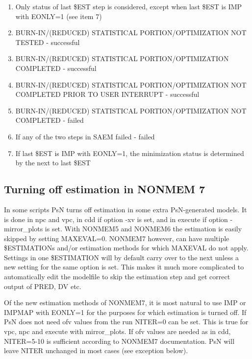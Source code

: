 \begin{enumerate}
\item Only status of last \$EST step is considered, except when last \$EST is IMP with EONLY=1 (see item 7)
\item BURN-IN/(REDUCED) STATISTICAL PORTION/OPTIMIZATION NOT TESTED - successful
\item BURN-IN/(REDUCED) STATISTICAL PORTION/OPTIMIZATION COMPLETED - successful
\item BURN-IN/(REDUCED) STATISTICAL PORTION/OPTIMIZATION NOT COMPLETED PRIOR TO USER INTERRUPT - successful
\item BURN-IN/(REDUCED) STATISTICAL PORTION/OPTIMIZATION NOT COMPLETED - failed
\item If any of the two steps in SAEM failed - failed 
\item If last \$EST is IMP with EONLY=1, the minimization status is determined by the next to last \$EST
\end{enumerate}

\subsection{Turning off estimation in NONMEM 7}

In some scripts PsN turns off estimation in some extra PsN-generated models. It is done in npc and vpc, in cdd if option -xv is set, and in execute if option -mirror\_plots is set. With NONMEM5 and NONMEM6 the estimation is easily skipped by setting MAXEVAL=0. NONMEM7 however,  can have multiple \$ESTIMATIONs and/or estimation methods for which MAXEVAL do not apply. Settings in one \$ESTIMATION will by default carry over to the next unless a new setting for the same option is set. This makes it much more complicated to automatically edit the modelfile to skip the estimation step and get correct output of PRED, DV etc. 

Of the new estimation methods of NONMEM7, it is most natural to use IMP or IMPMAP with EONLY=1 for the purposes for which estimation is turned off. If PsN does not need ofv values from the run NITER=0 can be set. This is true for vpc, npc and execute with mirror\_plots. If ofv values are needed as in cdd, NITER=5-10 is sufficient according to NONMEM7 documentation. PsN will leave NITER unchanged in most cases (see exception below).

